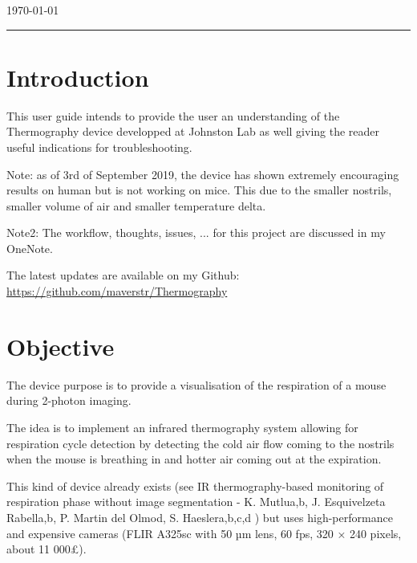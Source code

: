 \documentclass[a4paper]{article}
\begin{document}
\begin{titlepage}

{\large \today}\\[2cm] %


\vfill %

\end{titlepage}


\noindent\rule{\textwidth}{1pt}

\tableofcontents

\newpage

\listoffigures

\newpage



\section{Introduction}
This user guide intends to provide the user an understanding of the Thermography device developped at Johnston Lab as well giving the reader useful indications for troubleshooting.

Note: as of 3rd of September 2019, the device has shown extremely encouraging results on human but is not working on mice. This due to the smaller nostrils, smaller volume of air and smaller temperature delta.

Note2: The workflow, thoughts, issues, ... for this project are discussed in my OneNote.

The latest updates are available on my Github: \url{https://github.com/maverstr/Thermography}

\section{Objective}
The device purpose is to provide a visualisation of the respiration of a mouse during 2-photon imaging.

The idea is to implement an infrared thermography system allowing for respiration cycle detection by detecting the cold air flow coming to the nostrils when the mouse is breathing in and hotter air coming out at the expiration. 

This kind of device already exists (see IR thermography-based monitoring of respiration phase without
image segmentation - K. Mutlua,b, J. Esquivelzeta Rabella,b, P. Martin del Olmod, S. Haeslera,b,c,d ) but uses high-performance and expensive cameras (FLIR A325sc with 50 µm lens, 60 fps, 320 × 240 pixels, about 11 000£). 
\end{document}
